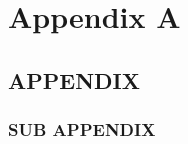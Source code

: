 \documentclass[../main/main]{subfiles}
\begin{document}
\chapter{Appendix A}
\label{appendixA}

\section{APPENDIX}
\label{appendix}
\lipsum[1]

\subsection{SUB APPENDIX}
\lipsum[1-2]

\printbibliography

\end{document}
